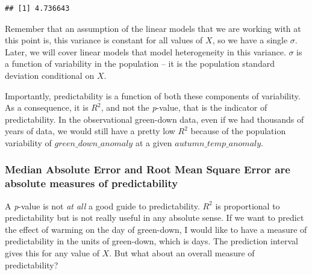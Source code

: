 \documentclass[]{book}
\newenvironment{Shaded}{\begin{snugshade}}{\end{snugshade}}
\newcommand{\CommentTok}[1]{\textcolor[rgb]{0.56,0.35,0.01}{\textit{#1}}}
\newcommand{\DecValTok}[1]{\textcolor[rgb]{0.00,0.00,0.81}{#1}}
\newcommand{\KeywordTok}[1]{\textcolor[rgb]{0.13,0.29,0.53}{\textbf{#1}}}
\newcommand{\NormalTok}[1]{#1}
\newcommand{\OperatorTok}[1]{\textcolor[rgb]{0.81,0.36,0.00}{\textbf{#1}}}
\newcommand{\StringTok}[1]{\textcolor[rgb]{0.31,0.60,0.02}{#1}}
\begin{document}
\begin{Shaded}
\end{Shaded}

\begin{verbatim}
## [1] 4.736643
\end{verbatim}

Remember that an assumption of the linear models that we are working with at this point is, this variance is constant for all values of \(X\), so we have a single \(\sigma\). Later, we will cover linear models that model heterogeneity in this variance. \(\sigma\) is a function of variability in the population -- it is the population standard deviation conditional on \(X\).

Importantly, predictability is a function of both these components of variability. As a consequence, it is \(R^2\), and not the \emph{p}-value, that is the indicator of predictability. In the observational green-down data, even if we had thousands of years of data, we would still have a pretty low \(R^2\) because of the population variability of \(green\_down\_anomaly\) at a given \(autumn\_temp\_anomaly\).

\hypertarget{median-absolute-error-and-root-mean-square-error-are-absolute-measures-of-predictability}{%
\subsubsection{Median Absolute Error and Root Mean Square Error are absolute measures of predictability}\label{median-absolute-error-and-root-mean-square-error-are-absolute-measures-of-predictability}}

A \emph{p}-value is not \emph{at all} a good guide to predictability. \(R^2\) is proportional to predictability but is not really useful in any absolute sense. If we want to predict the effect of warming on the day of green-down, I would like to have a measure of predictability in the units of green-down, which is days. The prediction interval gives this for any value of \(X\). But what about an overall measure of predictability?
\end{document}

